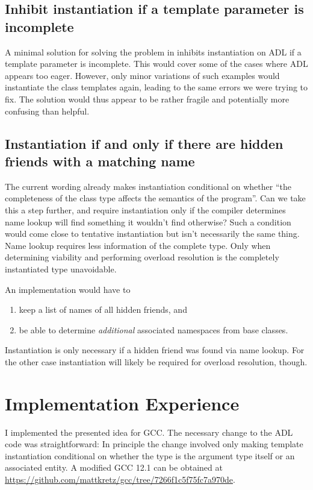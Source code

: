 \subsection{Inhibit instantiation if a template parameter is incomplete}

A minimal solution for solving the problem in  inhibits instantiation on ADL 
if a template parameter is incomplete. This would cover some of the cases where ADL 
appears too eager. However, only minor variations of such examples would instantiate the 
class templates again, leading to the same errors we were trying to fix. The solution 
would thus appear to be rather fragile and potentially more confusing than helpful.

\subsection{Instantiation if and only if there are hidden friends with a matching name}

The current wording already makes instantiation conditional on whether “the completeness 
of the class type affects the semantics of the program”. Can we take this a step further, 
and require instantiation only if the compiler determines name lookup will find something 
it wouldn't find otherwise? Such a condition would come close to tentative instantiation 
but isn't necessarily the same thing. Name lookup requires less information of the 
complete type. Only when determining viability and performing overload resolution is the 
completely instantiated type unavoidable.

An implementation would have to
\begin{enumerate}
\item keep a list of names of all hidden friends, and
\item be able to determine \emph{additional} associated namespaces from base classes.
\end{enumerate}
Instantiation is only necessary if a hidden friend was found via name lookup. For the 
other case instantiation will likely be required for overload resolution, though.

\section{Implementation Experience}
I implemented the presented idea for GCC. The necessary change to the ADL code was 
straightforward: In principle the change involved only making template instantiation 
conditional on whether the type is the argument type itself or an associated entity.
A modified GCC 12.1 can be obtained at 
\url{https://github.com/mattkretz/gcc/tree/7266f1c5f75fc7a970de}.


